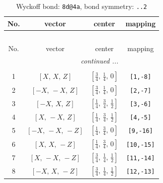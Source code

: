 \documentclass[fleqn,8pt]{jsarticle}
\begin{document}
\renewcommand{\arraystretch}{1.2}
\begin{longtable}{cccc}
\caption{Wyckoff bond: {\tt 8d@4a}, bond symmetry: {\tt ..2}}
 \\
 \hline \hline
No. & vector & center & mapping \\ \hline \endfirsthead

\multicolumn{3}{l}{\tablename\ \thetable{}} \\
 \hline \hline
No. & vector & center & mapping \\ \hline \endhead

 \hline \hline
\multicolumn{3}{r}{\footnotesize\it continued ...} \\ \endfoot

 \hline \hline
\multicolumn{3}{r}{} \\ \endlastfoot

1 & $\left[ X,\, X,\, Z \right]$ & $\left[ \frac{3}{4},\, \frac{1}{4},\, 0 \right]$ & {\tt [1,-8]} \\ \hline
2 & $\left[ - X,\, - X,\, Z \right]$ & $\left[ \frac{3}{4},\, \frac{1}{4},\, 0 \right]$ & {\tt [2,-7]} \\ \hline
3 & $\left[ - X,\, X,\, Z \right]$ & $\left[ \frac{1}{4},\, \frac{3}{4},\, \frac{1}{2} \right]$ & {\tt [3,-6]} \\ \hline
4 & $\left[ X,\, - X,\, Z \right]$ & $\left[ \frac{1}{4},\, \frac{3}{4},\, \frac{1}{2} \right]$ & {\tt [4,-5]} \\ \hline
5 & $\left[ - X,\, - X,\, - Z \right]$ & $\left[ \frac{1}{4},\, \frac{3}{4},\, 0 \right]$ & {\tt [9,-16]} \\ \hline
6 & $\left[ X,\, X,\, - Z \right]$ & $\left[ \frac{1}{4},\, \frac{3}{4},\, 0 \right]$ & {\tt [10,-15]} \\ \hline
7 & $\left[ X,\, - X,\, - Z \right]$ & $\left[ \frac{3}{4},\, \frac{1}{4},\, \frac{1}{2} \right]$ & {\tt [11,-14]} \\ \hline
8 & $\left[ - X,\, X,\, - Z \right]$ & $\left[ \frac{3}{4},\, \frac{1}{4},\, \frac{1}{2} \right]$ & {\tt [12,-13]} \\
\end{longtable}
\renewcommand{\arraystretch}{1.2}
\end{document}
